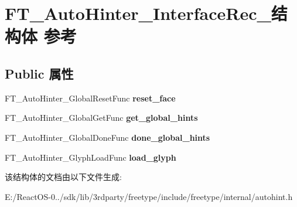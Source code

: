 \hypertarget{struct_f_t___auto_hinter___interface_rec__}{}\section{F\+T\+\_\+\+Auto\+Hinter\+\_\+\+Interface\+Rec\+\_\+结构体 参考}
\label{struct_f_t___auto_hinter___interface_rec__}
\subsection*{Public 属性}
\begin{DoxyCompactItemize}
\item 
\mbox{\label{struct_f_t___auto_hinter___interface_rec___ac49b1bea5a33eb6475a16d8297c8dc56}} 
F\+T\+\_\+\+Auto\+Hinter\+\_\+\+Global\+Reset\+Func {\bfseries reset\+\_\+face}
\item 
\mbox{\label{struct_f_t___auto_hinter___interface_rec___aa406ff1153cf6cc4a31d3b6ece46311c}} 
F\+T\+\_\+\+Auto\+Hinter\+\_\+\+Global\+Get\+Func {\bfseries get\+\_\+global\+\_\+hints}
\item 
\mbox{\label{struct_f_t___auto_hinter___interface_rec___a1dd9c798f14a5eb0f56d101c448a24b7}} 
F\+T\+\_\+\+Auto\+Hinter\+\_\+\+Global\+Done\+Func {\bfseries done\+\_\+global\+\_\+hints}
\item 
\mbox{\label{struct_f_t___auto_hinter___interface_rec___a9a71f9a4163791de748426b0075bc402}} 
F\+T\+\_\+\+Auto\+Hinter\+\_\+\+Glyph\+Load\+Func {\bfseries load\+\_\+glyph}
\end{DoxyCompactItemize}


该结构体的文档由以下文件生成\+:\begin{DoxyCompactItemize}
\item 
E\+:/\+React\+O\+S-\/0../sdk/lib/3rdparty/freetype/include/freetype/internal/autohint.\+h\end{DoxyCompactItemize}
